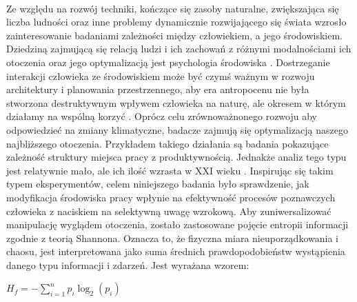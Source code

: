 \documentclass[12pt,a4paper,final,oneside,onecolumn,titlepage]{article}
\begin{document}
\paragraph{}
Ze względu na rozwój techniki, kończące się zasoby naturalne, zwiększająca się liczba ludności oraz inne problemy dynamicznie rozwijającego się świata wzrosło zainteresowanie badaniami zależności między człowiekiem, a jego środowiskiem. Dziedziną zajmującą się relacją ludzi i ich zachowań z różnymi modalnościami ich otoczenia oraz jego optymalizacją jest psychologia środowiska \citep{banka_psychologia_2018, gifford_environmental_2011}. Dostrzeganie interakcji człowieka ze środowiskiem może być czymś ważnym w rozwoju architektury i planowania przestrzennego, aby era antropocenu nie była stworzona destruktywnym wpływem człowieka na naturę, ale okresem w którym działamy na wspólną korzyć \citep{zalasiewicz_new_2010}. Oprócz celu zrównoważnonego rozwoju aby odpowiedzieć na zmiany klimatyczne, badacze zajmują się optymalizacją naszego najbliższego otoczenia. Przykładem takiego działania są badania \citet{lohr_interior_1996} pokazujące zależność struktury miejsca pracy z produktywnością. Jednakże analiz tego typu jest relatywnie mało, ale ich ilość wzrasta w XXI wieku \citep{spano_human_2020}. Inspirując się takim typem eksperymentów, celem niniejszego badania było sprawdzenie, jak modyfikacja środowiska pracy wpłynie na efektywność procesów poznawczych człowieka z naciskiem na selektywną uwagę wzrokową. Aby zuniwersalizować manipulację wyglądem otoczenia, zostało zastosowane pojęcie entropii informacji zgodnie z teorią Shannona. Oznacza to, że fizyczna miara nieuporządkowania i chaosu, jest interpretowana jako suma średnich prawdopodobieństw wystąpienia danego typu informacji i zdarzeń. Jest wyrażana wzorem:
\begin{center}
\begin{math}
H_f=-\displaystyle\sum_{i=1}^{n}p_i\log_2({p_i})
\end{math}
\end{center}
\end{document}

